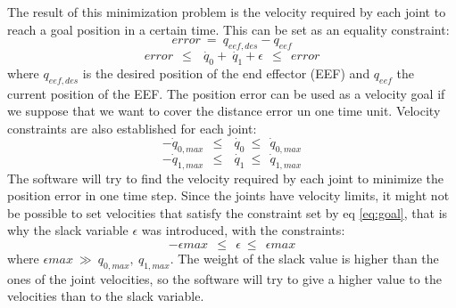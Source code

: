 The result of this minimization problem is the velocity required by each joint to reach a goal position in a certain time. This can be set as an equality constraint:
\begin{equation}
error\ =\ q_{eef,des} - q_{eef}
\label{eq:init_error}
\end{equation}
\begin{equation}
error\ \ \leq\ \ \dot{\ q_{0}} + \dot{\ q_{1}} + \epsilon\ \ \leq\ \ error
\label{eq:goal}
\end{equation}
where $q_{eef,des}$ is the desired position of the end effector (EEF) and $q_{eef}$ the current position of the EEF. The position error can be used as a velocity goal if we suppose that we want to cover the distance error un one time unit. Velocity constraints are also established for each joint:
\begin{equation}
-\dot{q}_{0,max}\ \ \leq\ \ \dot{\ q_{0}}\ \leq\ \ \dot{q}_{0,max}
\end{equation}
\begin{equation}
-\dot{q}_{1,max}\ \ \leq\ \ \dot{\ q_{1}}\ \leq\ \ \dot{q}_{1,max}
\end{equation}
The software will try to find the velocity required by each joint to minimize the position error in one time step. Since the joints have velocity limits, it might not be possible to set velocities that satisfy the constraint set by eq \ref{eq:goal}, that is why the slack variable $\epsilon$ was introduced, with the constraints: 
\begin{equation}
-\epsilon{max}\ \ \leq\ \ \epsilon\ \leq\ \ \epsilon{max}
\end{equation}
where $\epsilon{max}\ \gg\ q_{0,max},\ q_{1,max}$. The weight of the slack value is higher than the ones of the joint velocities, so the software will try to give a higher value to the velocities than to the slack variable.

